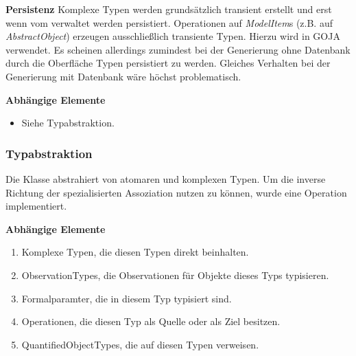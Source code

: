 \textbf{Persistenz} \newline
Komplexe Typen werden grundsätzlich transient erstellt und erst wenn vom  verwaltet werden persistiert. 
Operationen auf \emph{ModelItem}s (z.B.  auf \emph{AbstractObject}) erzeugen ausschließlich transiente Typen.
Hierzu wird in GOJA  verwendet. Es scheinen allerdings zumindest bei der Generierung ohne Datenbank
durch die Oberfläche Typen persistiert zu werden. Gleiches Verhalten bei der Generierung mit Datenbank wäre höchst problematisch.  

\textbf{Abhängige Elemente}
\begin{itemize}
	\item Siehe Typabstraktion.
\end{itemize}

\subsubsection{Typabstraktion}
Die Klasse  abstrahiert von atomaren und komplexen Typen. Um die inverse Richtung der spezialisierten Assoziation 
 nutzen zu können, wurde eine Operation  implementiert. 

\textbf{Abhängige Elemente}
\begin{enumerate}
  		\item Komplexe Typen, die diesen Typen direkt beinhalten.
  		\item ObservationTypes, die Observationen für Objekte dieses Typs typisieren.
  		\item Formalparamter, die in diesem Typ typisiert sind.
  		\item Operationen, die diesen Typ als Quelle oder als Ziel besitzen.
  		\item QuantifiedObjectTypes, die auf diesen Typen verweisen. 
\end{enumerate}
